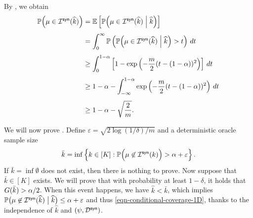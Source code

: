 By , we obtain
\begin{align*}
\mathbb{P}\Big( \mu \in \mathcal{I}^{\mathsf{syn}}(\widehat{k}) \Big)
&=
\mathbb{E}\left[ \mathbb{P} \Big( \mu \in \mathcal{I}^{\mathsf{syn}}(\widehat{k}) \Bigm| \widehat{k} \Big) \right] \\[4pt]
&=
\int_0^{\infty} \mathbb{P} \left( \mathbb{P} \Big( \mu \in \mathcal{I}^{\mathsf{syn}}(\widehat{k}) \Bigm| \widehat{k} \Big) > t \right) \,dt \\[4pt]
&\ge 
\int_0^{1-\alpha} \left[ 1 - \exp\left( -\frac{m}{2} (t - (1-\alpha) )^2 \right) \right] \,dt \\[4pt]
&\ge 
1-\alpha - \int_{-\infty}^{1-\alpha} \exp\left( -\frac{m}{2} (t - (1-\alpha) )^2 \right) \,dt \\[4pt]
&\ge 
1-\alpha - \sqrt{\frac{2}{m}}.
\end{align*}

We will now prove . Define $\varepsilon = \sqrt{2\log(1/\delta) / m}$ and a deterministic oracle sample size
\begin{equation}\label{eqn-oracle-k-1D}
\bar{k} = \inf \left\{ k\in [K] : \mathbb{P} \Big( \mu \not\in \mathcal{I}^{\mathsf{syn}}(k) \Big)  
> \alpha + \varepsilon \right\}.
\end{equation}
If $\bar{k} = \inf\emptyset$ does not exist, then there is nothing to prove. Now suppose that $\bar{k} \in [K]$ exists. We will prove that with probability at least $1-\delta$, it holds that $G(\bar{k}) > \alpha/2$. When this event happens, we have $\widehat{k} < \bar{k}$, which implies $\mathbb{P}\big( \mu \not\in \mathcal{I}^{\mathsf{syn}}(\widehat{k}) \bigm| \widehat{k} \big) \le \alpha+\varepsilon$ and thus \eqref{eqn-conditional-coverage-1D}, thanks to the independence of $\widehat{k}$ and $(\psi,\mathcal{D}^{\mathsf{syn}})$.

